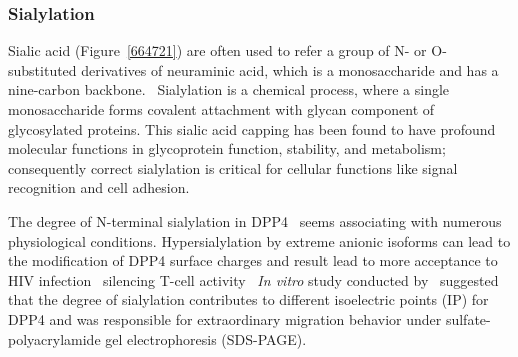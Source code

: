 \subsubsection {Sialylation}
Sialic acid (Figure~\ref{664721}) are often used to refer a group of N- or O-substituted derivatives of neuraminic acid, which is a monosaccharide and has a nine-carbon backbone.~\cite{Vocadlo_2009} Sialylation is a chemical process, where a single monosaccharide forms covalent attachment with glycan component of glycosylated proteins. This sialic acid capping has been found to have profound molecular functions in glycoprotein function, stability, and metabolism; consequently correct sialylation is critical for cellular functions like signal recognition and cell adhesion.~\cite{Bhide_2016}
\par 
The degree of N-terminal sialylation in DPP4~\cite{Stehling_1999} seems associating with numerous physiological conditions. Hypersialylation by extreme anionic isoforms can lead to the modification of DPP4 surface charges and result lead to more acceptance to HIV infection~\cite{SMITH_1998}
silencing T-cell activity~\cite{K_hne_1996} 
\textit{In vitro} study conducted by~\citet{Schmauser1999} suggested that the degree of sialylation contributes to different isoelectric points (IP) for DPP4 and was responsible for extraordinary migration behavior under sulfate-polyacrylamide gel electrophoresis (SDS-PAGE).